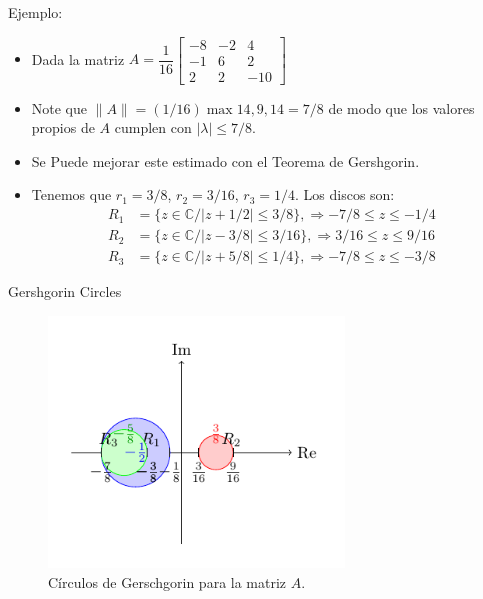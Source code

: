 \documentclass[11pt]{beamer}
\begin{document}
    \begin{frame}{Ejemplo:}    
      \begin{itemize}
      \item<1-> Dada la matriz $A= \dfrac{1}{16}\left[\begin{array}{ccc}
        -8 & -2 & 4 \\
        -1 & 6 & 2 \\
        2 & 2 & -10      
      \end{array}\right]$
      \item<2-> Note que $\|A\| = (1/16)\max{14,9,14} = 7/8$ de modo que los valores propios de $A$ cumplen con $|\lambda| \leq 7/8$.
      \item<3-> Se Puede mejorar este estimado con el Teorema de Gershgorin.
      \item Tenemos que $r_1 =3/8$, $r_2 = 3/16$, $r_3 = 1/4$. Los discos son:
      \begin{align*}
      R_1 & = \{ z \in \mathbb{C} / |z+1/2|\leq 3/8\}, \Rightarrow -7/8 \leq z \leq -1/4\\
      R_2 & = \{ z \in \mathbb{C} / |z-3/8|\leq 3/16\}, \Rightarrow 3/16 \leq z \leq 9/16\\
      R_3 & = \{ z \in \mathbb{C} / |z+5/8|\leq 1/4\}, \Rightarrow -7/8 \leq z \leq -3/8
      \end{align*}
      \end{itemize}      
    \end{frame}
    \begin{frame}{Gershgorin Circles}
      \begin{figure}[ht]
          \centering
          \includegraphics[width=0.7\textwidth]{prueba.pdf} %
          \caption{C\'irculos de Gerschgorin para la matriz $A$.}
      \end{figure}
  \end{frame}
\end{document}
